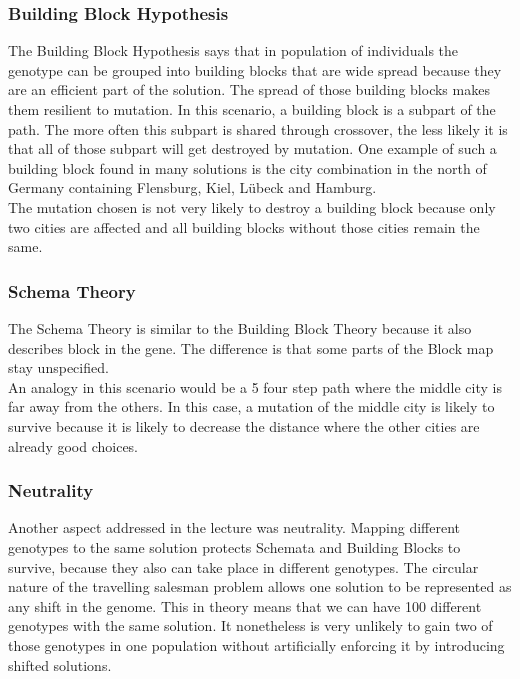 \documentclass{scrartcl}
\begin{document}
\subsubsection{Building Block Hypothesis}
The Building Block Hypothesis says that in population of individuals the genotype can be grouped into building blocks that are wide spread because they are an efficient part of the solution. The spread of those building blocks makes them resilient to mutation. In this scenario, a building block is a subpart of the path. The more often this subpart is shared through crossover, the less likely it is that all of those subpart will get destroyed by mutation. One example of such a building block found in many solutions is the city combination in the north of Germany containing Flensburg, Kiel, Lübeck and Hamburg.\\
The mutation chosen is not very likely to destroy a building block because only two cities are affected and all building blocks without those cities remain the same.
\subsubsection{Schema Theory}
The Schema Theory is similar to the Building Block Theory because it also describes block in the gene. The difference is that some parts of the Block map stay unspecified.\\
An analogy in this scenario would be a 5 four step path where the middle city is far away from the others. In this case, a mutation of the middle city is likely to survive because it is likely to decrease the distance where the other cities are already good choices.
 
 \subsubsection{Neutrality}
Another aspect addressed in the lecture was neutrality. Mapping different genotypes to the same solution protects Schemata and Building Blocks to survive, because they also can take place in different genotypes. The circular nature of the travelling salesman problem allows one solution to be represented as any shift in the genome. This in theory means that we can have 100 different genotypes with the same solution. It nonetheless is very unlikely to gain two of those genotypes in one population without artificially enforcing it by introducing shifted solutions.
\end{document}
